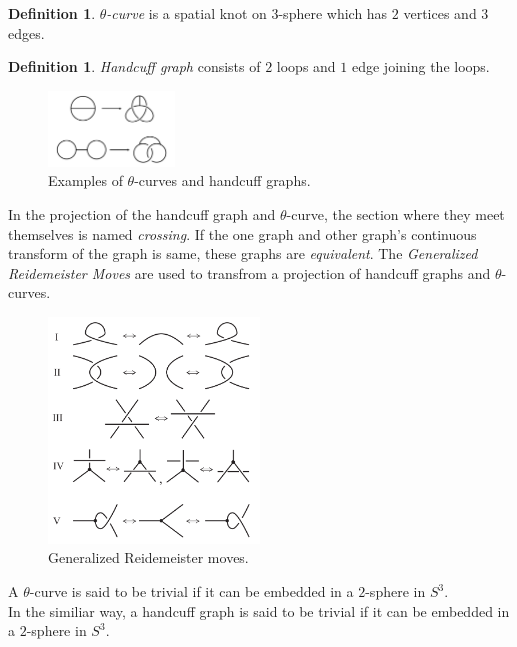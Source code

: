 \documentclass{article}
\theoremstyle{definition}
\newtheorem{defn}[thm]{Definition}
\theoremstyle{theorem}
\theoremstyle{proposition}
\theoremstyle{corollary}
\begin{document}
\begin{defn}
    \textit{$\theta$-curve} is a spatial knot on $3$-sphere which has $2$ vertices and $3$ edges. 
\end{defn}
\begin{defn}
    \textit{Handcuff graph} consists of $2$ loops and $1$ edge joining the loops.
\end{defn}

\begin{figure}[h]
    \centerline{\includegraphics[width=0.3\textwidth]{figure/theta and handcuff graph.png}}
    \caption{Examples of $\theta$-curves and handcuff graphs.}
    \label{figure_1} 
\end{figure}

In the projection of the handcuff graph and $\theta$-curve, the section where they meet themselves is named \textit{crossing}. 
If the one graph and other graph's continuous transform of the graph is same, these graphs are \textit{equivalent}. 
The \textit{Generalized Reidemeister Moves} are used to transfrom a projection of handcuff graphs and $\theta$-curves.\\

\begin{figure}[h]
    \centerline{\includegraphics[width=0.5\textwidth]{figure/reidemeister.png}}
    \caption{Generalized Reidemeister moves.}
    \label{figure_1} 
\end{figure}

A $\theta$-curve is said to be trivial if it can be embedded in a $2$-sphere in $S^3$. \\
In the similiar way, a handcuff graph is said to be trivial if it can be embedded in a $2$-sphere in $S^3$.
\end{document}
